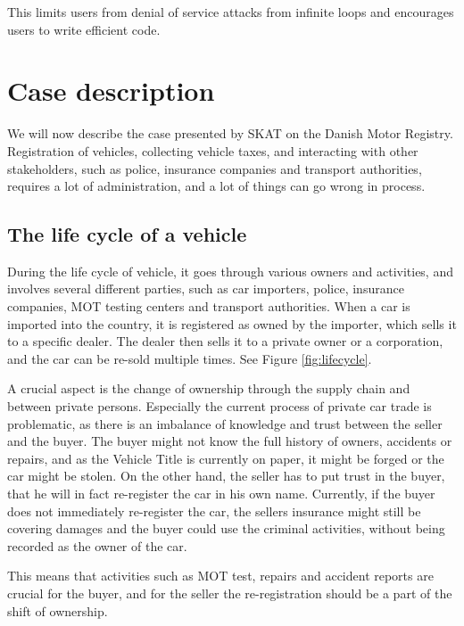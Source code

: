 \documentclass[oneside,a4paper,10pts,article]{memoir}
\begin{document}
This limits users from denial of service attacks from infinite loops
and encourages users to write efficient code.

\newpage
\chapter{Case description}
\label{sec:case}
We will now describe the case presented by SKAT on the Danish Motor
Registry. Registration of vehicles, collecting vehicle taxes, and
interacting with other stakeholders, such as police, insurance
companies and transport authorities, requires a lot of administration,
and a lot of things can go wrong in process.

\section{The life cycle of a vehicle}
During the life cycle of vehicle, it goes through various owners and
activities, and involves several different parties, such as car
importers, police, insurance companies, MOT testing centers and
transport authorities. When a car is imported into the country, it is
registered as owned by the importer, which sells it to a specific
dealer. The dealer then sells it to a private owner or a corporation,
and the car can be re-sold multiple times. See Figure \ref{fig:lifecycle}.

A crucial aspect is the change of ownership through the supply chain
and between private persons. Especially the current process of private
car trade is problematic, as there is an imbalance of knowledge and
trust between the seller and the buyer. The buyer might not know the
full history of owners, accidents or repairs, and as the Vehicle Title
is currently on paper, it might be forged or the car might be
stolen. On the other hand, the seller has to put trust in the buyer,
that he will in fact re-register the car in his own name. Currently,
if the buyer does not immediately re-register the car, the sellers
insurance might still be covering damages and the buyer could use the
criminal activities, without being recorded as the owner of the car.

This means that activities such as MOT test, repairs and accident
reports are crucial for the buyer, and for the seller the
re-registration should be a part of the shift of ownership.
\end{document}
